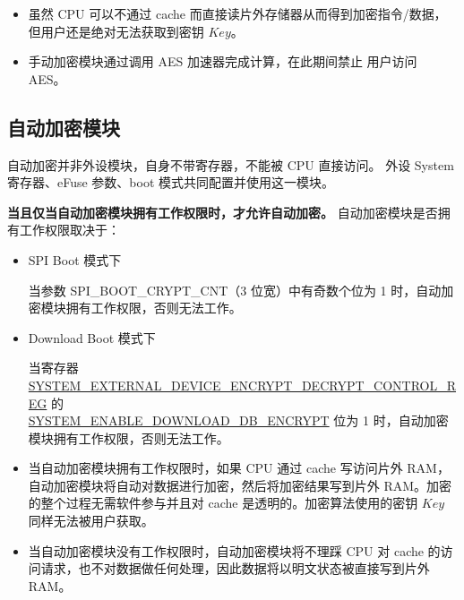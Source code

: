 \documentclass[main\_\_CN.tex]{subfiles}
\begin{document}
\begin{tiplisting}
\vspace{-2em}
\begin{itemize}
\item 虽然 CPU 可以不通过 cache 而直接读片外存储器从而得到加密指令/数据，
但用户还是绝对无法获取到密钥 \begin{math}Key\end{math}。

\item 手动加密模块通过调用 AES 加速器完成计算，在此期间禁止 用户访问 AES。
\end{itemize}
\end{tiplisting}

\subsection{自动加密模块}

自动加密并非外设模块，自身不带寄存器，不能被 CPU 直接访问。
外设 System 寄存器、eFuse 参数、boot 模式共同配置并使用这一模块。

\textbf{当且仅当自动加密模块拥有工作权限时，才允许自动加密。} 自动加密模块是否拥有工作权限取决于：

\begin{itemize}

    \item SPI Boot 模式下

    当参数 SPI\_BOOT\_CRYPT\_CNT（3 位宽）中有奇数个位为 1 时，自动加密模块拥有工作权限，否则无法工作。

    \item Download Boot 模式下

    当寄存器 \hyperref[regdesc:SYSTEMEXTERNALDEVICEENCRYPTDECRYPTCONTROLREG]{SYSTEM\_EXTERNAL\_DEVICE\_ENCRYPT\_DECRYPT\_CONTROL\_REG} 的\\ \hyperref[fielddesc:SYSTEMENABLEDOWNLOADDBENCRYPT]{SYSTEM\_ENABLE\_DOWNLOAD\_DB\_ENCRYPT} 位为 1 时，自动加密模块拥有工作权限，否则无法工作。

\end{itemize}


\begin{tiplisting}
\vspace{-2em}
\begin{itemize}

\item 当自动加密模块拥有工作权限时，如果 CPU 通过 cache 写访问片外 RAM，自动加密模块将自动对数据进行加密，然后将加密结果写到片外 RAM。加密的整个过程无需软件参与并且对 cache 是透明的。加密算法使用的密钥 \begin{math}Key\end{math} 同样无法被用户获取。

\item 当自动加密模块没有工作权限时，自动加密模块将不理踩 CPU 对 cache 的访问请求，也不对数据做任何处理，因此数据将以明文状态被直接写到片外 RAM。

\end{itemize}
\end{tiplisting}
\end{document}
